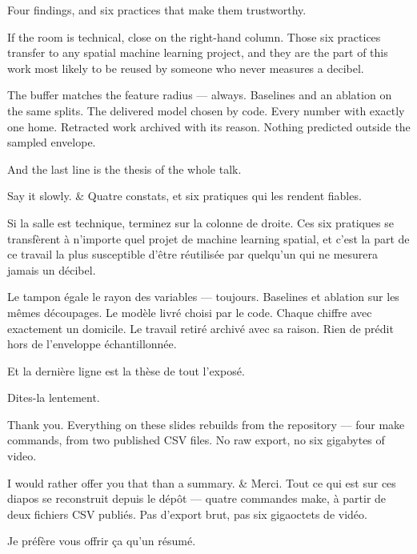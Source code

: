 \documentclass[10pt,a4paper]{article}
\begin{document}
\begin{say}
Four findings, and six practices that make them trustworthy.

If the room is technical, close on the right-hand column. Those six practices
transfer to any spatial machine learning project, and they are the part of this
work most likely to be reused by someone who never measures a decibel.

The buffer matches the feature radius --- always. Baselines and an ablation on the
same splits. The delivered model chosen by code. Every number with exactly one
home. Retracted work archived with its reason. Nothing predicted outside the
sampled envelope.

And the last line is the thesis of the whole talk. 

Say it slowly.
&
Quatre constats, et six pratiques qui les rendent fiables.

Si la salle est technique, terminez sur la colonne de droite. Ces six pratiques se
transfèrent à n'importe quel projet de machine learning spatial, et c'est la part
de ce travail la plus susceptible d'être réutilisée par quelqu'un qui ne mesurera
jamais un décibel.

Le tampon égale le rayon des variables --- toujours. Baselines et ablation sur les
mêmes découpages. Le modèle livré choisi par le code. Chaque chiffre avec
exactement un domicile. Le travail retiré archivé avec sa raison. Rien de prédit
hors de l'enveloppe échantillonnée.

Et la dernière ligne est la thèse de tout l'exposé. 

Dites-la lentement.
\end{say}

\begin{say}
Thank you. Everything on these slides rebuilds from the repository --- four make
commands, from two published CSV files. No raw export, no six gigabytes of video.

I would rather offer you that than a summary.
&
Merci. Tout ce qui est sur ces diapos se reconstruit depuis le dépôt --- quatre
commandes make, à partir de deux fichiers CSV publiés. Pas d'export brut, pas six
gigaoctets de vidéo.

Je préfère vous offrir ça qu'un résumé.
\end{say}
\end{document}
